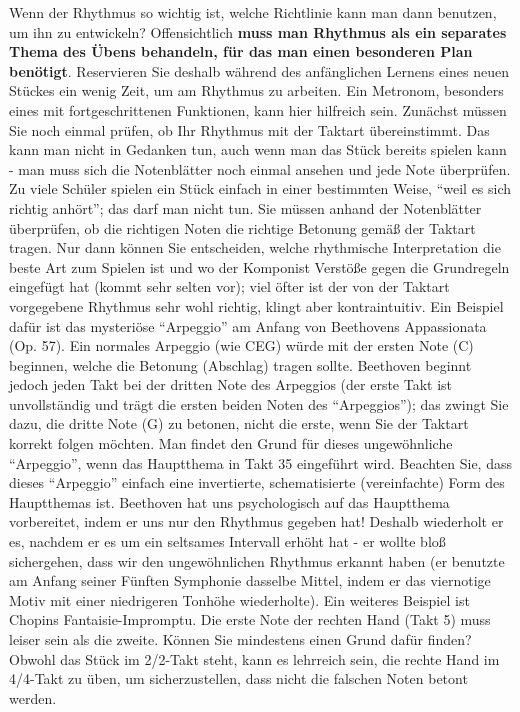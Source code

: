 Wenn der Rhythmus so wichtig ist, welche Richtlinie kann man dann benutzen, um ihn zu entwickeln?
Offensichtlich \textbf{muss man Rhythmus als ein separates Thema des Übens behandeln, für das man einen besonderen Plan benötigt}.
Reservieren Sie deshalb während des anfänglichen Lernens eines neuen Stückes ein wenig Zeit, um am Rhythmus zu arbeiten.
Ein Metronom, besonders eines mit fortgeschrittenen Funktionen, kann hier hilfreich sein.
Zunächst müssen Sie noch einmal prüfen, ob Ihr Rhythmus mit der Taktart übereinstimmt.
Das kann man nicht in Gedanken tun, auch wenn man das Stück bereits spielen kann - man muss sich die Notenblätter noch einmal ansehen und jede Note überprüfen.
Zu viele Schüler spielen ein Stück einfach in einer bestimmten Weise, \enquote{weil es sich richtig anhört}; das darf man nicht tun.
Sie müssen anhand der Notenblätter überprüfen, ob die richtigen Noten die richtige Betonung gemäß der Taktart tragen.
Nur dann können Sie entscheiden, welche rhythmische Interpretation die beste Art zum Spielen ist und wo der Komponist Verstöße gegen die Grundregeln eingefügt hat (kommt sehr selten vor); viel öfter ist der von der Taktart vorgegebene Rhythmus sehr wohl richtig, klingt aber kontraintuitiv.
Ein Beispiel dafür ist das mysteriöse \enquote{Arpeggio} am Anfang von Beethovens Appassionata (Op. 57).
Ein normales Arpeggio (wie CEG) würde mit der ersten Note (C) beginnen, welche die Betonung (Abschlag) tragen sollte.
Beethoven beginnt jedoch jeden Takt bei der dritten Note des Arpeggios (der erste Takt ist unvollständig und trägt die ersten beiden Noten des \enquote{Arpeggios}); das zwingt Sie dazu, die dritte Note (G) zu betonen, nicht die erste, wenn Sie der Taktart korrekt folgen möchten.
Man findet den Grund für dieses ungewöhnliche \enquote{Arpeggio}, wenn das Hauptthema in Takt 35 eingeführt wird.
Beachten Sie, dass dieses \enquote{Arpeggio} einfach eine invertierte, schematisierte (vereinfachte) Form des Hauptthemas ist.
Beethoven hat uns psychologisch auf das Hauptthema vorbereitet, indem er uns nur den Rhythmus gegeben hat!
Deshalb wiederholt er es, nachdem er es um ein seltsames Intervall erhöht hat - er wollte bloß sichergehen, dass wir den ungewöhnlichen Rhythmus erkannt haben (er benutzte am Anfang seiner Fünften Symphonie dasselbe Mittel, indem er das viernotige Motiv mit einer niedrigeren Tonhöhe wiederholte).
Ein weiteres Beispiel ist Chopins Fantaisie-Impromptu.
Die erste Note der rechten Hand (Takt 5) muss leiser sein als die zweite.
Können Sie mindestens einen Grund dafür finden?
Obwohl das Stück im 2/2-Takt steht, kann es lehrreich sein, die rechte Hand im 4/4-Takt zu üben, um sicherzustellen, dass nicht die falschen Noten betont werden.

